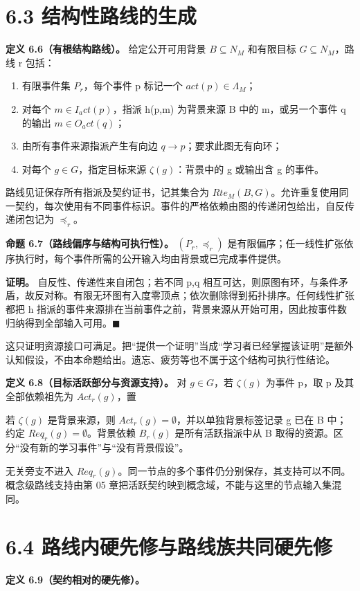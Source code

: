 \documentclass[UTF8,a4paper,zihao=-4,fontset=windows,openany]{ctexbook}
\newcommand{\mcsdisplay}[1]{%
  \par\addvspace{0.7em}%
  \sbox{\mcsmathbox}{\ensuremath{\displaystyle #1}}%
  \ifdim\wd\mcsmathbox>\linewidth
    \noindent\resizebox{\linewidth}{!}{\usebox{\mcsmathbox}}%
  \else
    \noindent\hspace*{\fill}\usebox{\mcsmathbox}\hspace*{\fill}%
  \fi
  \par\addvspace{0.7em}%
}
\def\ensuremath#1{#1}%
\def\mathrm#1{#1}%
\begin{document}
\section{6.3 结构性路线的生成}
\textbf{定义 6.6（有根结构路线）。} 给定公开可用背景 \(B\subseteq N_M\) 和有限目标 \(G\subseteq N_M\)，路线 r 包括：

\begin{enumerate}
\item 有限事件集 \(P_r\)，每个事件 p 标记一个 \(\mathrm{act}(p)\in\Lambda_M\)；
\item 对每个 \(m\in I_\mathrm{act}(p)\)，指派 h(p,m) 为背景来源 B 中的 m，或另一个事件 q 的输出 \(m\in O_\mathrm{act}(q)\)；
\item 由所有事件来源指派产生有向边 \(q\to p\)；要求此图无有向环；
\item 对每个 \(g\in G\)，指定目标来源 \(\zeta(g)\)：背景中的 g 或输出含 g 的事件。
\end{enumerate}
路线见证保存所有指派及契约证书，记其集合为 \(\mathrm{Rte}_M(B,G)\)。允许重复使用同一契约，每次使用有不同事件标识。事件的严格依赖由图的传递闭包给出，自反传递闭包记为 \(\preceq_r\)。

\textbf{命题 6.7（路线偏序与结构可执行性）。} \((P_r,\preceq_r)\) 是有限偏序；任一线性扩张依序执行时，每个事件所需的公开输入均由背景或已完成事件提供。

\textbf{证明。} 自反性、传递性来自闭包；若不同 p,q 相互可达，则原图有环，与条件矛盾，故反对称。有限无环图有入度零顶点；依次删除得到拓扑排序。任何线性扩张都把 h 指派的事件来源排在当前事件之前，背景来源从开始可用，因此按事件数归纳得到全部输入可用。\(\blacksquare\)

这只证明资源接口可满足。把“提供一个证明”当成“学习者已经掌握该证明”是额外认知假设，不由本命题给出。遗忘、疲劳等也不属于这个结构可执行性结论。

\textbf{定义 6.8（目标活跃部分与资源支持）。} 对 \(g\in G\)，若 \(\zeta(g)\) 为事件 p，取 p 及其全部依赖祖先为 \(\mathrm{Act}_r(g)\)，置


\mcsdisplay{Req_r(g)=\bigcup_{q\in Act_r(g)} I_{act(q)}.}
\noindent 若 \(\zeta(g)\) 是背景来源，则 \(\mathrm{Act}_r(g)=\emptyset\)，并以单独背景标签记录 g 已在 B 中；约定 \(\mathrm{Req}_r(g)=\emptyset\)。背景依赖 \(B_r(g)\) 是所有活跃指派中从 B 取得的资源。区分“没有新的学习事件”与“没有背景假设”。

无关旁支不进入 \(\mathrm{Req}_r(g)\)。同一节点的多个事件仍分别保存，其支持可以不同。概念级路线支持由第 05 章把活跃契约映到概念域，不能与这里的节点输入集混同。

\section{6.4 路线内硬先修与路线族共同硬先修}
\textbf{定义 6.9（契约相对的硬先修）。}
\end{document}
